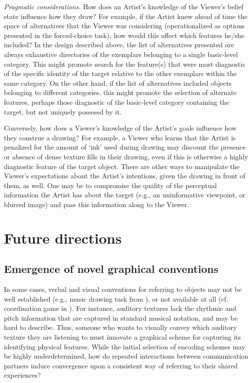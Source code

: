 \documentclass[12pt]{article}
\begin{document}
\emph{Pragmatic considerations.} How does an Artist's knowledge of the Viewer's belief state influence how they draw? For example, if the Artist knew ahead of time the space of alternatives that the Viewer was considering (operationalized as options presented in the forced-choice task), how would this affect which features he/she included? In the design described above, the list of alternatives presented are always exhaustive directories of the exemplars belonging to a single basic-level category. This might promote search for the feature(s) that were most diagnostic of the specific identity of the target relative to the other exemplars within the same category. On the other hand, if the list of alternatives included objects belonging to different categories, this might promote the selection of alternate features, perhaps those diagnostic of the basic-level category containing the target, but not uniquely possesed by it. 

Conversely, how does a Viewer's knowledge of the Artist's goals influence how they construe a drawing? For example, a Viewer who learns that the Artist is penalized for the amount of `ink' used during drawing may discount the presence or absence of dense texture fills in their drawing, even if this is otherwise a highly diagnostic feature of the target object. There are other ways to manipulate the Viewer's expectations about the Artist's intentions, given the drawing in front of them, as well. One may be to compromise the quality of the perceptual information the Artist has about the target (e.g., an uninformative viewpoint, or blurred image) and pass this information along to the Viewer.


\section{Future directions}

\subsection{Emergence of novel graphical conventions}

In some cases, verbal and visual conventions for referring to objects may not be well established (e.g., music drawing task from ), or not available at all (cf. coordination game in ). For instance, auditory textures \cite{McDermott:2013ky} lack the rhythmic and pitch information that are captured in standard musical notation, and may be hard to describe. Thus, someone who wants to visually convey which auditory texture they are listening to must innovate a graphical scheme for capturing its identifying physical features. While the initial selection of encoding schemes may be highly underdetermined, how do repeated interactions between communication partners induce convergence upon a consistent way of referring to their shared experiences?


\setlength{\bibleftmargin}{.125in}
\setlength{\bibindent}{-\bibleftmargin}

\end{document}
